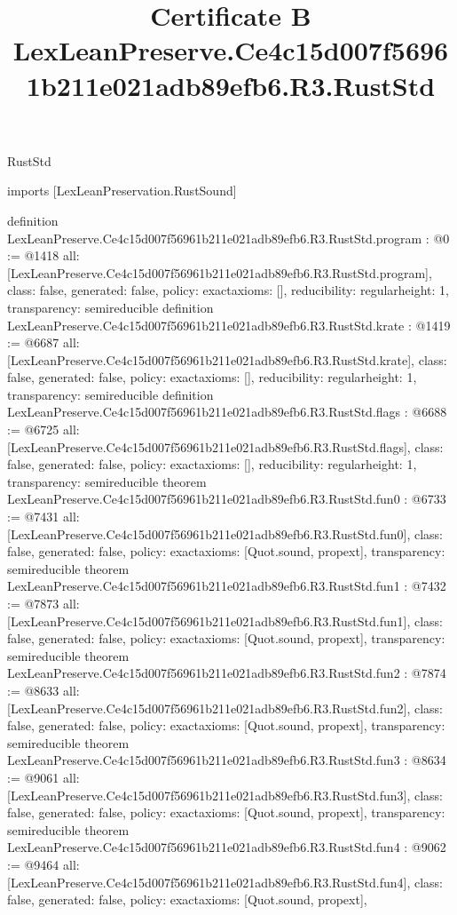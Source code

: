 \begin{lexlean}{RustStd}
\title{Certificate B LexLeanPreserve.Ce4c15d007f56961b211e021adb89efb6.R3.RustStd}
\begin{coremodule}
imports [LexLeanPreservation.RustSound]

definition LexLeanPreserve.Ce4c15d007f56961b211e021adb89efb6.R3.RustStd.program : @0 := @1418 {
  all: [LexLeanPreserve.Ce4c15d007f56961b211e021adb89efb6.R3.RustStd.program],
  class: false,
  generated: false,
  policy: exact{axioms: []},
  reducibility: regular{height: 1},
  transparency: semireducible
}
definition LexLeanPreserve.Ce4c15d007f56961b211e021adb89efb6.R3.RustStd.krate : @1419 := @6687 {
  all: [LexLeanPreserve.Ce4c15d007f56961b211e021adb89efb6.R3.RustStd.krate],
  class: false,
  generated: false,
  policy: exact{axioms: []},
  reducibility: regular{height: 1},
  transparency: semireducible
}
definition LexLeanPreserve.Ce4c15d007f56961b211e021adb89efb6.R3.RustStd.flags : @6688 := @6725 {
  all: [LexLeanPreserve.Ce4c15d007f56961b211e021adb89efb6.R3.RustStd.flags],
  class: false,
  generated: false,
  policy: exact{axioms: []},
  reducibility: regular{height: 1},
  transparency: semireducible
}
theorem LexLeanPreserve.Ce4c15d007f56961b211e021adb89efb6.R3.RustStd.fun0 : @6733 := @7431 {
  all: [LexLeanPreserve.Ce4c15d007f56961b211e021adb89efb6.R3.RustStd.fun0],
  class: false,
  generated: false,
  policy: exact{axioms: [Quot.sound, propext]},
  transparency: semireducible
}
theorem LexLeanPreserve.Ce4c15d007f56961b211e021adb89efb6.R3.RustStd.fun1 : @7432 := @7873 {
  all: [LexLeanPreserve.Ce4c15d007f56961b211e021adb89efb6.R3.RustStd.fun1],
  class: false,
  generated: false,
  policy: exact{axioms: [Quot.sound, propext]},
  transparency: semireducible
}
theorem LexLeanPreserve.Ce4c15d007f56961b211e021adb89efb6.R3.RustStd.fun2 : @7874 := @8633 {
  all: [LexLeanPreserve.Ce4c15d007f56961b211e021adb89efb6.R3.RustStd.fun2],
  class: false,
  generated: false,
  policy: exact{axioms: [Quot.sound, propext]},
  transparency: semireducible
}
theorem LexLeanPreserve.Ce4c15d007f56961b211e021adb89efb6.R3.RustStd.fun3 : @8634 := @9061 {
  all: [LexLeanPreserve.Ce4c15d007f56961b211e021adb89efb6.R3.RustStd.fun3],
  class: false,
  generated: false,
  policy: exact{axioms: [Quot.sound, propext]},
  transparency: semireducible
}
theorem LexLeanPreserve.Ce4c15d007f56961b211e021adb89efb6.R3.RustStd.fun4 : @9062 := @9464 {
  all: [LexLeanPreserve.Ce4c15d007f56961b211e021adb89efb6.R3.RustStd.fun4],
  class: false,
  generated: false,
  policy: exact{axioms: [Quot.sound, propext]},
}
\end{coremodule}
\end{lexlean}
